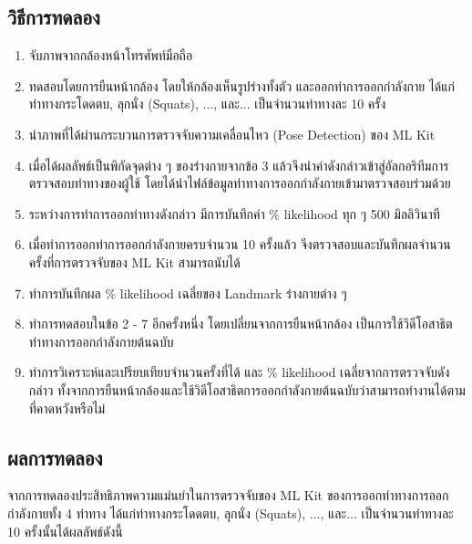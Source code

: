 \subsection{วิธีการทดลอง}
\begin{enumerate}
	\item จับภาพจากกล้องหน้าโทรศัพท์มือถือ
	\item ทดสอบโดยการยืนหน้ากล้อง โดยให้กล้องเห็นรูปร่างทั้งตัว และออกท่าการออกกำลังกาย ได้แก่ท่าทางกระโดดตบ, ลุกนั่ง (Squats), ..., และ... เป็นจำนวนท่าทางละ 10 ครั้ง
	\item นำภาพที่ได้ผ่านกระบวนการตรวจจับความเคลื่อนไหว (Pose Detection) ของ ML Kit
	\item เมื่อได้ผลลัพธ์เป็นพิกัดจุดต่าง ๆ ของร่างกายจากข้อ 3 แล้วจึงนำค่าดังกล่าวเข้าสู่อัลกอริทึมการตรวจสอบท่าทางของผู้ใช้ โดยได้นำไฟล์ข้อมูลท่าทางการออกกำลังกายเข้ามาตรวจสอบร่วมด้วย
	\item ระหว่างการทำการออกท่าทางดังกล่าว มีการบันทึกค่า \% likelihood ทุก ๆ 500 มิลลิวินาที
	\item เมื่อทำการออกท่าการออกกำลังกายครบจำนวน 10 ครั้งแล้ว จีงตรวจสอบและบันทึกผลจำนวนครั้งที่การตรวจจับของ ML Kit สามารถนับได้
	\item ทำการบันทึกผล \% likelihood เฉลี่ยของ Landmark ร่างกายต่าง ๆ
	\item ทำการทดสอบในข้อ 2 - 7 อีกครั้งหนึ่ง โดยเปลี่ยนจากการยืนหน้ากล้อง เป็นการใช้วิดีโอสาธิตท่าทางการออกกำลังกายต้นฉบับ
	\item ทำการวิเคราะห์และเปรียบเทียบจำนวนครั้งที่ได้ และ \% likelihood เฉลี่ยจากการตรวจจับดังกล่าว ทั้งจากการยืนหน้ากล้องและใช้วิดีโอสาธิตการออกกำลังกายต้นฉบับว่าสามารถทำงานได้ตามที่คาดหวังหรือไม่
\end{enumerate}
\subsection{ผลการทดลอง}
จากการทดลองประสิทธิภาพความแม่นยำในการตรวจจับของ ML Kit ของการออกท่าทางการออกกำลังกายทั้ง 4 ท่าทาง ได้แก่ท่าทางกระโดดตบ, ลุกนั่ง (Squats), ..., และ... เป็นจำนวนท่าทางละ 10 ครั้งนั้นได้ผลลัพธ์ดังนี้
